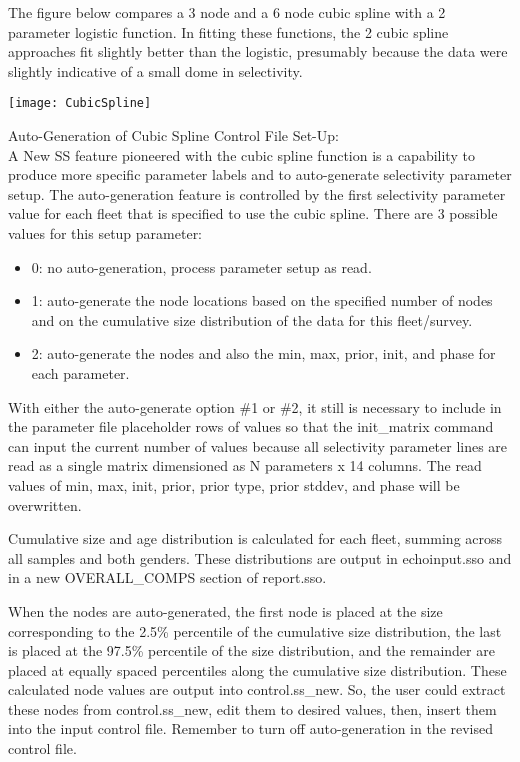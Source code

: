 \begin{description}
	The figure below compares a 3 node and a 6 node cubic spline with a 2 parameter logistic function.  In fitting these functions, the 2 cubic spline approaches fit slightly better than the logistic, presumably because the data were slightly indicative of a small dome in selectivity.\\
	\begin{center}
		\texttt{[image: CubicSpline]}
	\end{center}
	
	Auto-Generation of Cubic Spline Control File Set-Up:\\
	A New SS feature pioneered with the cubic spline function is a capability to produce more specific parameter labels and to auto-generate selectivity parameter setup.  The auto-generation feature is controlled by the first selectivity parameter value for each fleet that is specified to use the cubic spline.  There are 3 possible values for this setup parameter:
	\begin{itemize}
		\item 0: no auto-generation, process parameter setup as read.
		\item 1: auto-generate the node locations based on the specified number of nodes and on the cumulative size distribution of the data for this fleet/survey.
		\item 2: auto-generate the nodes and also the min, max, prior, init, and phase for each parameter.
	\end{itemize}
	
	With either the auto-generate option \#1 or \#2, it still is necessary to include in the parameter file placeholder rows of values so that the init\_matrix command can input the current number of values because all selectivity parameter lines are read as a single matrix dimensioned as N parameters x 14 columns.  The read values of min, max, init, prior, prior type, prior stddev, and phase will be overwritten.
	
	Cumulative size and age distribution is calculated for each fleet, summing across all samples and both genders.  These distributions are output in echoinput.sso and in a new OVERALL\_COMPS section of report.sso.
	
	When the nodes are auto-generated, the first node is placed at the size corresponding to the 2.5\% percentile of the cumulative size distribution, the last is placed at the 97.5\% percentile of the size distribution, and the remainder are placed at equally spaced percentiles along the cumulative size distribution.  These calculated node values are output into control.ss\_new.  So, the user could extract these nodes from control.ss\_new, edit them to desired values, then, insert them into the input control file.  Remember to turn off auto-generation in the revised control file.
	

\end{description}
